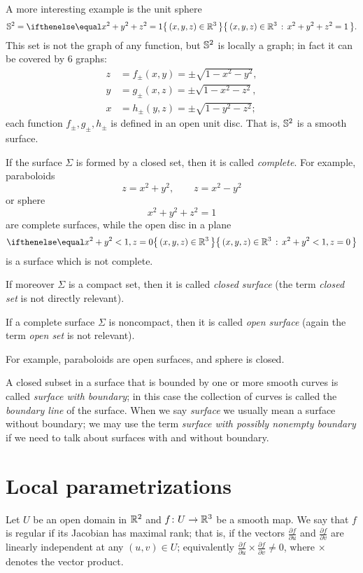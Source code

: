 A more interesting example is the unit sphere 
\[\SS^2=\set{(x,y,z)\in\RR^3}{x^2+y^2+z^2=1}.\]
This set is not the graph of any function,
but $\mathbb{S}^2$ is locally a graph;
in fact it can be covered by 6 graphs:
\begin{align*}
z&=f_\pm(x,y)=\pm \sqrt{1-x^2-y^2},
\\
y&=g_\pm(x,z)=\pm \sqrt{1-x^2-z^2},
\\
x&=h_\pm(y,z)=\pm \sqrt{1-y^2-z^2};
\end{align*}
each function $f_\pm,g_\pm,h_\pm$ is defined in an open unit disc.
That is, $\mathbb{S}^2$ is a smooth surface.

If the surface $\Sigma$ is formed by a closed set, then it is called \emph{complete}.
For example, paraboloids 
\[z=x^2+y^2,\quad\quad z=x^2-y^2\]
or sphere 
\[x^2+y^2+z^2=1\]
are complete surfaces, while the
open disc in a plane 
\[\set{(x,y,z)\in\RR^3}{x^2+y^2<1, z=0}\]
is a surface which is not complete.

If moreover $\Sigma$ is a compact set, then it is called \emph{closed surface} (the term \emph{closed set} is not directly relevant).

If a complete surface $\Sigma$ is noncompact, then it is called  \emph{open surface} (again the term \emph{open set} is not relevant).

For example, paraboloids 
are open surfaces, 
and sphere is closed.

A closed subset in a surface that is bounded by one or more smooth %
curves is called \emph{surface with boundary}; in this case the collection of curves is called the \emph{boundary line} of the surface.
When we say \emph{surface} we usually mean a surface without boundary;
we may use the term \emph{surface with possibly nonempty boundary} if we need to talk about surfaces with and without boundary.

\section*{Local parametrizations}

Let $U$ be an open domain in $\mathbb{R}^2$ and $f\colon U\to \mathbb{R}^3$ be a smooth map.
We say that $f$ is regular if its Jacobian has maximal rank;
that is, if the vectors $\tfrac{\partial f}{\partial u}$ and $\tfrac{\partial f}{\partial v}$ are linearly independent at any $(u,v)\in U$;
equivalently $\tfrac{\partial f}{\partial u}\times\tfrac{\partial f}{\partial v}\ne 0$, where $\times$ denotes the vector product.


